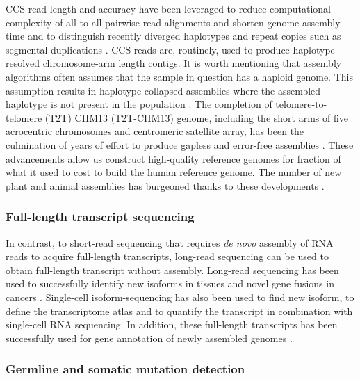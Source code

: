 CCS read length and accuracy have been leveraged to reduce computational complexity of all-to-all pairwise read alignments and shorten genome assembly time \cite{Chin_undated-ye} and to distinguish recently diverged haplotypes and repeat copies such as segmental duplications \cite{Nurk2020-gu, Cheng2021-ij}. CCS reads are, routinely, used to produce haplotype-resolved chromosome-arm length contigs. It is worth mentioning that assembly algorithms often assumes that the sample in question has a haploid genome. This assumption results in haplotype collapsed assemblies where the assembled haplotype is not present in the population \cite{Schneider2017-yo}. The completion of telomere-to-telomere (T2T) CHM13 (T2T-CHM13) genome, including the short arms of five acrocentric chromosomes and centromeric satellite array, has been the culmination of years of effort to produce gapless and error-free assemblies \cite{Nurk2022-dv}. These advancements allow us construct high-quality reference genomes for fraction of what it used to cost to build the human reference genome. The number of new plant and animal assemblies has burgeoned thanks to these developments \cite{}. 

\subsubsection{Full-length transcript sequencing}

In contrast, to short-read sequencing that requires \textit{de novo} assembly of RNA reads to acquire full-length transcripts, long-read sequencing can be used to obtain full-length transcript without assembly. Long-read sequencing has been used to successfully identify new isoforms in tissues and novel gene fusions in cancers \cite{}. Single-cell isoform-sequencing has also been used to find new isoform, to define the transcriptome atlas and to quantify the transcript in combination with single-cell RNA sequencing. In addition, these full-length transcripts has been successfully used for gene annotation of newly assembled genomes \cite{}.

\subsubsection{Germline and somatic mutation detection}


